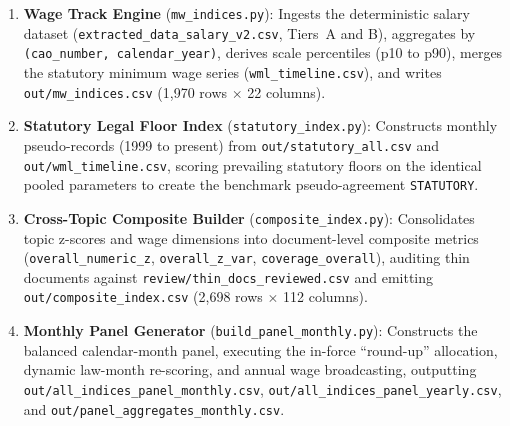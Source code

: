 \begin{enumerate}[leftmargin=1.8em]
\begin{itemize}[leftmargin=1.2em]
      \item \nolinkurl{fringe_index.py}: Scores 3 numeric fields (commuting allowance per km, meal stipend, relocation reimbursement) and 8 presence booleans.
      \item \nolinkurl{absence_index.py}: Scores 8 numeric fields (statutory and extra vacation days, holiday allowance bonus, sick pay continuation percentage, sick pay duration, short-term care days and pay, long-term care weeks and pay) and 3 booleans.
      \item \nolinkurl{parental_leave_index.py}: Computes full-rate equivalent (FRE) weeks across maternity, paternity, adoption, and parental leave (\nolinkurl{fre_total_extracted}, \nolinkurl{fre_total_with_statutory}) alongside 12 family leave generosity booleans.
    \end{itemize}

  \item \textbf{Wage Track Engine} (\nolinkurl{mw_indices.py}):
    Ingests the deterministic salary dataset (\nolinkurl{extracted_data_salary_v2.csv}, Tiers~A and B), aggregates by \nolinkurl{(cao_number, calendar_year)}, derives scale percentiles (p10 to p90), merges the statutory minimum wage series (\nolinkurl{wml_timeline.csv}), and writes \nolinkurl{out/mw_indices.csv} (1,970 rows $\times$ 22 columns).

  \item \textbf{Statutory Legal Floor Index} (\nolinkurl{statutory_index.py}):
    Constructs monthly pseudo-records (1999 to present) from \nolinkurl{out/statutory_all.csv} and \nolinkurl{out/wml_timeline.csv}, scoring prevailing statutory floors on the identical pooled parameters to create the benchmark pseudo-agreement \texttt{STATUTORY}.

  \item \textbf{Cross-Topic Composite Builder} (\nolinkurl{composite_index.py}):
    Consolidates topic z-scores and wage dimensions into document-level composite metrics (\nolinkurl{overall_numeric_z}, \nolinkurl{overall_z_var}, \nolinkurl{coverage_overall}), auditing thin documents against \nolinkurl{review/thin_docs_reviewed.csv} and emitting \nolinkurl{out/composite_index.csv} (2,698 rows $\times$ 112 columns).

  \item \textbf{Monthly Panel Generator} (\nolinkurl{build_panel_monthly.py}):
    Constructs the balanced calendar-month panel, executing the in-force ``round-up'' allocation, dynamic law-month re-scoring, and annual wage broadcasting, outputting \nolinkurl{out/all_indices_panel_monthly.csv}, \nolinkurl{out/all_indices_panel_yearly.csv}, and \nolinkurl{out/panel_aggregates_monthly.csv}.


\end{enumerate}

